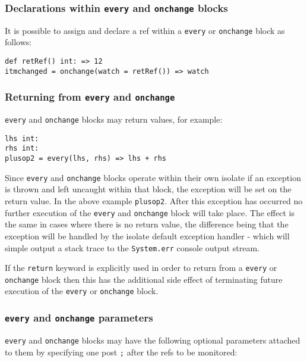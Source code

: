 \documentclass[conc-doc]{subfiles}
\begin{document}
\subsubsection{Declarations within \lstinline{every} and \lstinline{onchange} blocks}
It is possible to assign and declare a ref within a \lstinline{every} or \lstinline{onchange} block as follows:
\begin{lstlisting}
def retRef() int: => 12
itmchanged = onchange(watch = retRef()) => watch
\end{lstlisting}	

\subsubsection{Returning from \lstinline{every} and \lstinline{onchange}}
\label{subsubsec:returnEveryonechange}
\lstinline{every} and \lstinline{onchange} blocks may return values, for example:

\begin{lstlisting}
lhs int:
rhs int:
plusop2 = every(lhs, rhs) => lhs + rhs
\end{lstlisting}	

Since \lstinline{every} and \lstinline{onchange} blocks operate within their own isolate if an exception is thrown and left uncaught within that block, the exception will be set on the return value. In the above example \lstinline{plusop2}. After this exception has occurred no further execution of the \lstinline{every} and \lstinline{onchange} block will take place. The effect is the same in cases where there is no return value, the difference being that the exception will be handled by the isolate default exception handler - which will simple output a stack trace to the \lstinline{System.err} console output stream.

If the \lstinline{return} keyword is explicitly used in order to return from a \lstinline{every} or \lstinline{onchange} block then this has the additional side effect of terminating future execution of the \lstinline{every} or \lstinline{onchange} block.

\subsubsection{\lstinline{every} and \lstinline{onchange} parameters}
\lstinline{every} and \lstinline{onchange} blocks may have the following optional parameters attached to them by specifying one post \lstinline{;} after the refs to be monitored:
\end{document}
